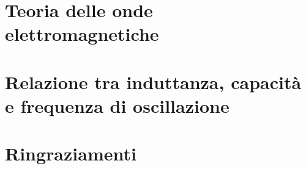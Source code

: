 \documentclass[12pt,a4paper,twoside]{book}
\begin{document}
\appendix
\renewcommand{\chaptername}{Appendice}
\chapter{Teoria delle onde elettromagnetiche}
\thispagestyle{chapterplain}
\label{chap:appendice_onde}

\clearpage{\pagestyle{empty}\cleardoublepage}


\chapter{Relazione tra induttanza, capacità e frequenza di oscillazione}
\thispagestyle{chapterplain}
\label{chap:appendice_oscill}

\clearpage{\pagestyle{empty}\cleardoublepage}
    
\pagestyle{plain}
\cleardoublepage
\setcounter{page}{1}
\renewcommand{\thepage}{B\arabic{page}}




\pagestyle{chapterstar}
\chapter*{Ringraziamenti}
\thispagestyle{chapterstar}
\label{ringraziamenti}
% 
\clearpage{\pagestyle{empty}\cleardoublepage}
\end{document}

